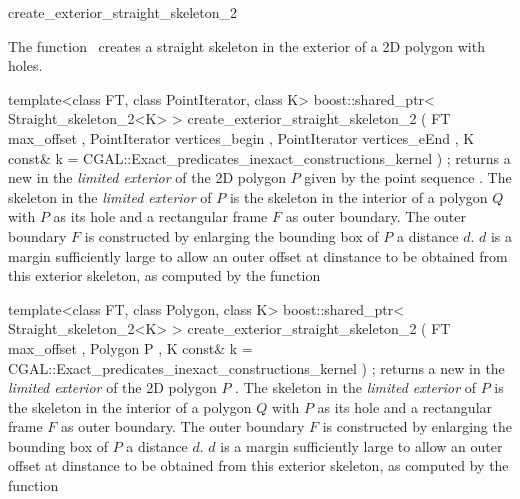 

\begin{ccRefFunction}{create_exterior_straight_skeleton_2}


\ccDefinition

The function \ccRefName\ creates a straight skeleton in the exterior of a 2D polygon with holes.


\ccFunction
{template<class FT, class PointIterator, class K>
boost::shared_ptr< Straight_skeleton_2<K> >
create_exterior_straight_skeleton_2 ( FT            max_offset
                                    , PointIterator vertices_begin
                                    , PointIterator vertices_eEnd
                                    , K const&      k = CGAL::Exact_predicates_inexact_constructions_kernel
                                    ) ;
}
{returns a new  in the {\em limited exterior} of the 2D polygon $P$ given by the point sequence .
The skeleton in the {\em limited exterior} of $P$ is the skeleton in the interior of a polygon $Q$ with $P$ as its hole and a rectangular frame $F$ as outer boundary.
The outer boundary $F$ is constructed by enlarging the bounding box of $P$ a distance $d$. 
$d$ is a margin sufficiently large to allow an outer offset at dinstance  to be obtained from this exterior skeleton, as computed by the function  
}

\ccFunction
{template<class FT, class Polygon, class K>
boost::shared_ptr< Straight_skeleton_2<K> >
create_exterior_straight_skeleton_2 ( FT       max_offset
                                    , Polygon  P
                                    , K const& k = CGAL::Exact_predicates_inexact_constructions_kernel
                                    ) ;
}
{returns a new  in the {\em limited exterior} of the 2D polygon $P$ .
The skeleton in the {\em limited exterior} of $P$ is the skeleton in the interior of a polygon $Q$ with $P$ as its hole and a rectangular frame $F$ as outer boundary.
The outer boundary $F$ is constructed by enlarging the bounding box of $P$ a distance $d$. 
$d$ is a margin sufficiently large to allow an outer offset at dinstance  to be obtained from this exterior skeleton, as computed by the function  
}


\end{ccRefFunction}
